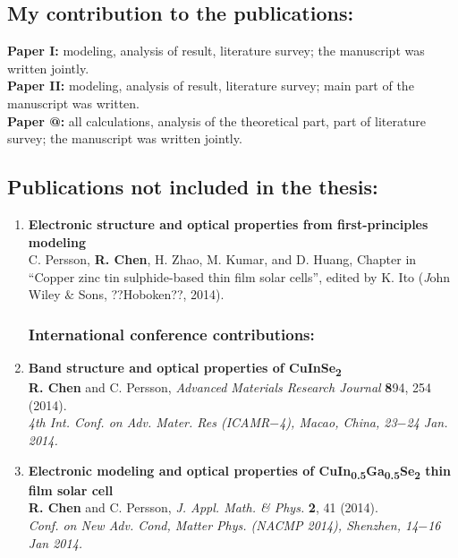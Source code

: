 \documentclass[a4paper, 12pt, titlepage,oneside,drop]{kthesis}
\makeatletter
\newcommand{\Rmnum}[1]{\expandafter\@slowromancap\romannumeral #1@}
\makeatother
\begin{document}
\subsection*{My contribution to the publications:}

\textbf{Paper I:} modeling, analysis of result, literature survey;
the manuscript was written jointly.\\
\textbf{Paper II:} modeling, analysis of result, literature survey; main part of the manuscript was written.\\
\textbf{Paper \Rmnum{3}:} all calculations, analysis of the theoretical part, part of literature survey;
the manuscript was written jointly.\\

\subsection*{Publications not included in the thesis:}
\begin{enumerate}
\renewcommand{\labelenumi}{\Roman{enumi}}
\setcounter{enumi}{3}

\subsubsection*{Book chapter:}
\item{}\textbf{Electronic structure and optical properties from first-principles modeling} \\
C. Persson, \textbf{R. Chen}, H. Zhao, M. Kumar, and D. Huang, Chapter in “Copper zinc tin sulphide-based thin film solar cells”,
edited by K. Ito ({\textit John Wiley $\&$ Sons}, ??Hoboken??, 2014).



\subsubsection*{International conference contributions:}
\renewcommand{\labelenumi}{\Roman{enumi}}
\setcounter{enumi}{4}

\item{} \textbf{Band structure and optical properties of CuInSe\textsubscript{2}}
\\ \textbf{R. Chen} and C. Persson, 
\textit{Advanced Materials Research Journal} {\textbf 894}, 254 (2014). \\
\textit{4th Int. Conf. on Adv. Mater. Res (ICAMR$-$4), Macao, China, 23$-$24 Jan. 2014.}


\item{} \textbf{Electronic modeling and optical properties of CuIn\textsubscript{0.5}Ga\textsubscript{0.5}Se\textsubscript{2} thin film solar cell}
\\ \textbf{R. Chen} and C. Persson,
\textit{J. Appl. Math. \& Phys.} {\textbf 2}, 41 (2014). \\
\textit{Conf. on New Adv. Cond, Matter Phys. (NACMP 2014), Shenzhen, 14$-$16 Jan 2014.}

\end{enumerate}
\end{document}
